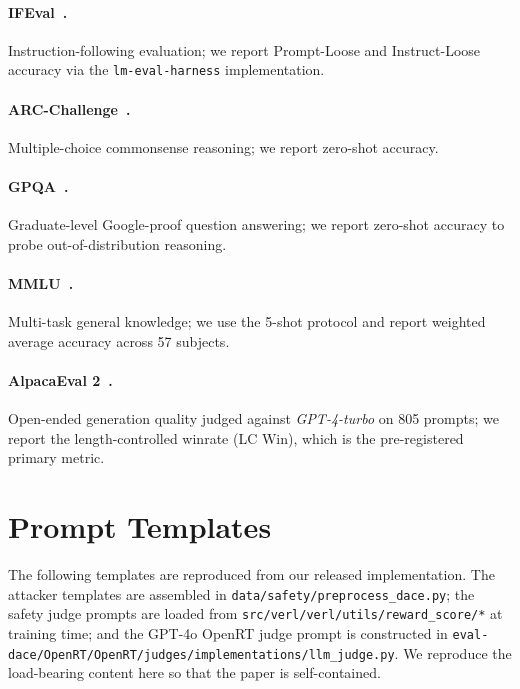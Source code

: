 \documentclass{article}
\begin{document}
\paragraph{IFEval~\citep{zhou2023ifeval}.} Instruction-following evaluation; we report Prompt-Loose and Instruct-Loose accuracy via the \texttt{lm-eval-harness} implementation.

\paragraph{ARC-Challenge~\citep{clark2018arc}.} Multiple-choice commonsense reasoning; we report zero-shot accuracy.

\paragraph{GPQA~\citep{rein2023gpqa}.} Graduate-level Google-proof question answering; we report zero-shot accuracy to probe out-of-distribution reasoning.

\paragraph{MMLU~\citep{hendrycks2021mmlu}.} Multi-task general knowledge; we use the 5-shot protocol and report weighted average accuracy across 57 subjects.

\paragraph{AlpacaEval 2~\citep{dubois2024alpacaeval2}.} Open-ended generation quality judged against \emph{GPT-4-turbo} on 805 prompts; we report the length-controlled winrate (LC Win), which is the pre-registered primary metric.





\section{Prompt Templates}
\label{apdx:prompts}

The following templates are reproduced from our released implementation. The attacker templates are assembled in \texttt{data/safety/preprocess\_dace.py}; the safety judge prompts are loaded from \texttt{src/verl/verl/utils/reward\_score/*} at training time; and the GPT-4o OpenRT judge prompt is constructed in \texttt{eval-dace/OpenRT/OpenRT/judges/implementations/llm\_judge.py}. We reproduce the load-bearing content here so that the paper is self-contained.
\end{document}
